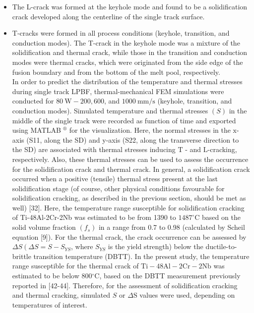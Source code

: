 \documentclass[10pt]{article}
\begin{document}
\begin{itemize}
  \item The L-crack was formed at the keyhole mode and found to be a solidification crack developed along the centerline of the single track surface.

  \item T-cracks were formed in all process conditions (keyhole, transition, and conduction modes). The T-crack in the keyhole mode was a mixture of the solidification and thermal crack, while those in the transition and conduction modes were thermal cracks, which were originated from the side edge of the fusion boundary and from the bottom of the melt pool, respectively.\\
In order to predict the distribution of the temperature and thermal stresses during single track LPBF, thermal-mechanical FEM simulations were conducted for $80 \mathrm{~W}-200,600$, and $1000 \mathrm{~mm} / \mathrm{s}$ (keyhole, transition, and conduction modes). Simulated temperature and thermal stresses $(S)$ in the middle of the single track were recorded as function of time and exported using MATLAB ${ }^{\circledR}$ for the visualization. Here, the normal stresses in the $\mathrm{x}$-axis (S11, along the SD) and y-axis (S22, along the transverse direction to the SD) are associated with thermal stresses inducing $\mathrm{T}$ - and $\mathrm{L}$-cracking, respectively. Also, these thermal stresses can be used to assess the occurrence for the solidification crack and thermal crack. In general, a solidification crack occurred when a positive (tensile) thermal stress present at the last solidification stage (of course, other physical conditions favourable for solidification cracking, as described in the previous section, should be met as well) [32]. Here, the temperature range susceptible for solidification cracking of Ti-48Al-2Cr-2Nb was estimated to be from 1390 to $1487^{\circ} \mathrm{C}$ based on the solid volume fraction $\left(f_{s}\right)$ in a range from 0.7 to 0.98 (calculated by Scheil equation [9]). For the thermal crack, the crack occurrence can be assessed by $\Delta S\left(\Delta S=S-S_{Y S}\right.$, where $S_{Y S}$ is the yield strength) below the ductile-to-brittle transition temperature (DBTT). In the present study, the temperature range susceptible for the thermal crack of $\mathrm{Ti}-48 \mathrm{Al}-2 \mathrm{Cr}-2 \mathrm{Nb}$ was estimated to be below $800{ }^{\circ} \mathrm{C}$, based on the DBTT measurement previously reported in [42-44]. Therefore, for the assessment of solidification cracking and thermal cracking, simulated $S$ or $\Delta \mathrm{S}$ values were used, depending on temperatures of interest.

\end{itemize}
\end{document}
